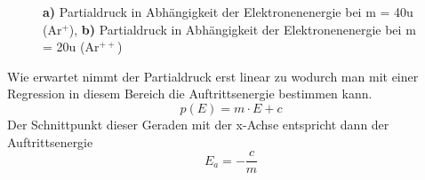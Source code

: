 \begin{figure}[h]
	\centering
	\caption{\textbf{a)} Partialdruck in Abhängigkeit der Elektronenenergie bei m = 40\;u (Ar$^+$), \textbf{b)} Partialdruck in Abhängigkeit der Elektronenenergie bei m = 20\;u (Ar$^{++}$)}
	\label{fig:2_1_plot}
\end{figure}

Wie erwartet nimmt der Partialdruck erst linear zu wodurch man mit einer Regression in diesem Bereich die Auftrittsenergie bestimmen kann.
\begin{equation}
	p(E) = m\cdot E + c
\end{equation}
Der Schnittpunkt dieser Geraden mit der x-Achse entspricht dann der Auftrittsenergie
\begin{equation}
	E_a = -\frac{c}{m}
\end{equation}


